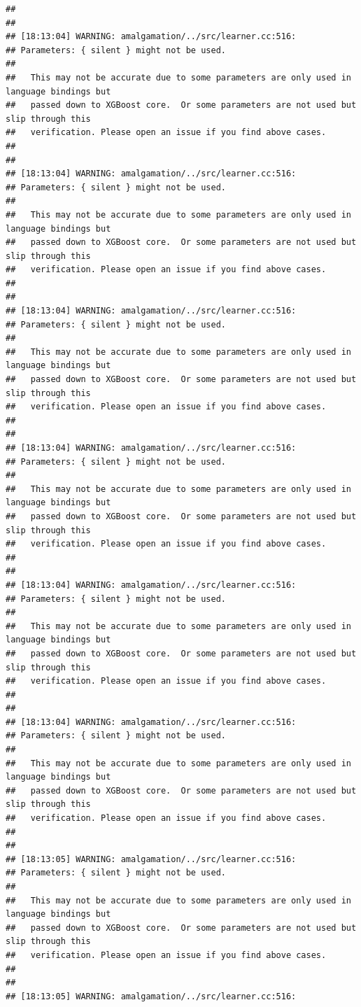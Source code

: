 \documentclass[AMS,STIX2COL]{WileyNJD-v2}\usepackage[]{graphicx}\usepackage[]{color}
\makeatletter
\newenvironment{kframe}{%
 \def\at@end@of@kframe{}%
 \ifinner\ifhmode%
  \def\at@end@of@kframe{\end{minipage}}%
  \begin{minipage}{\columnwidth}%
 \fi\fi%
 \def\FrameCommand##1{\hskip\@totalleftmargin \hskip-\fboxsep
 \colorbox{shadecolor}{##1}\hskip-\fboxsep
     \hskip-\linewidth \hskip-\@totalleftmargin \hskip\columnwidth}%
 \MakeFramed {\advance\hsize-\width
   \@totalleftmargin\z@ \linewidth\hsize
   \@setminipage}}%
 {\par\unskip\endMakeFramed%
 \at@end@of@kframe}
\newenvironment{knitrout}{}{} %
\makeatother
\begin{document}
\begin{knitrout}
\begin{kframe}
\begin{verbatim}
## 
## 
## [18:13:04] WARNING: amalgamation/../src/learner.cc:516: 
## Parameters: { silent } might not be used.
## 
##   This may not be accurate due to some parameters are only used in language bindings but
##   passed down to XGBoost core.  Or some parameters are not used but slip through this
##   verification. Please open an issue if you find above cases.
## 
## 
## [18:13:04] WARNING: amalgamation/../src/learner.cc:516: 
## Parameters: { silent } might not be used.
## 
##   This may not be accurate due to some parameters are only used in language bindings but
##   passed down to XGBoost core.  Or some parameters are not used but slip through this
##   verification. Please open an issue if you find above cases.
## 
## 
## [18:13:04] WARNING: amalgamation/../src/learner.cc:516: 
## Parameters: { silent } might not be used.
## 
##   This may not be accurate due to some parameters are only used in language bindings but
##   passed down to XGBoost core.  Or some parameters are not used but slip through this
##   verification. Please open an issue if you find above cases.
## 
## 
## [18:13:04] WARNING: amalgamation/../src/learner.cc:516: 
## Parameters: { silent } might not be used.
## 
##   This may not be accurate due to some parameters are only used in language bindings but
##   passed down to XGBoost core.  Or some parameters are not used but slip through this
##   verification. Please open an issue if you find above cases.
## 
## 
## [18:13:04] WARNING: amalgamation/../src/learner.cc:516: 
## Parameters: { silent } might not be used.
## 
##   This may not be accurate due to some parameters are only used in language bindings but
##   passed down to XGBoost core.  Or some parameters are not used but slip through this
##   verification. Please open an issue if you find above cases.
## 
## 
## [18:13:04] WARNING: amalgamation/../src/learner.cc:516: 
## Parameters: { silent } might not be used.
## 
##   This may not be accurate due to some parameters are only used in language bindings but
##   passed down to XGBoost core.  Or some parameters are not used but slip through this
##   verification. Please open an issue if you find above cases.
## 
## 
## [18:13:05] WARNING: amalgamation/../src/learner.cc:516: 
## Parameters: { silent } might not be used.
## 
##   This may not be accurate due to some parameters are only used in language bindings but
##   passed down to XGBoost core.  Or some parameters are not used but slip through this
##   verification. Please open an issue if you find above cases.
## 
## 
## [18:13:05] WARNING: amalgamation/../src/learner.cc:516: 

\end{verbatim}
\end{kframe}
\end{knitrout}
\end{document}

